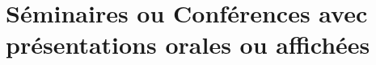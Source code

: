 \documentclass[french,a4paper,oneside]{article}%
\begin{document}
\begin{etaremune}
\item {}
\item {}
\item {}
\item {}
\item {}

\item {}
\item {}

\item {}

\end{etaremune}%


\section{Séminaires ou Conférences avec présentations orales ou affichées}%
\end{document}
